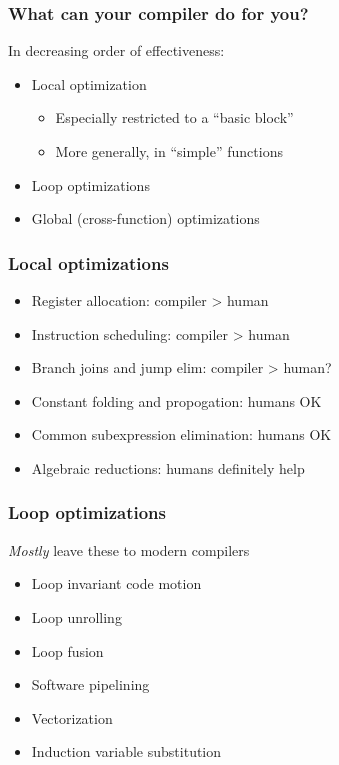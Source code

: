 \documentclass{beamer}
\begin{document}
\begin{frame}
  \frametitle{What can your compiler do for you?}

  In decreasing order of effectiveness:
  \begin{itemize}
  \item Local optimization
    \begin{itemize}
    \item Especially restricted to a ``basic block''
    \item More generally, in ``simple'' functions
    \end{itemize}
  \item Loop optimizations
  \item Global (cross-function) optimizations
  \end{itemize}
\end{frame}


\begin{frame}
  \frametitle{Local optimizations}

  \begin{itemize}
  \item Register allocation: compiler > human
  \item Instruction scheduling: compiler > human
  \item Branch joins and jump elim: compiler > human?
  \item Constant folding and propogation: humans OK
  \item Common subexpression elimination: humans OK
  \item Algebraic reductions: humans definitely help
  \end{itemize}
\end{frame}


\begin{frame}
  \frametitle{Loop optimizations}

  {\em Mostly} leave these to modern compilers
  \begin{itemize}
  \item Loop invariant code motion
  \item Loop unrolling
  \item Loop fusion
  \item Software pipelining
  \item Vectorization
  \item Induction variable substitution
  \end{itemize}

\end{frame}
\end{document}
